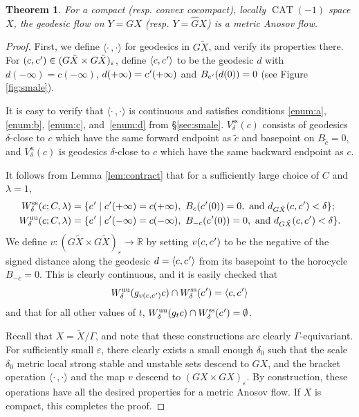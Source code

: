 \documentclass[JEP,XML,SOM,Unicode,NoFloatCountersInSection]{cedram}
\let\epsilon\varepsilon
\let\sep\mid
\newcommand{\lrangle}{\langle\cdot\,,\cdot\rangle}
\newcommand{\cpr}{c\mkern1mu'}
\newcommand{\sts}{\mathrm{ss}}
\newcommand{\uu}{\mathrm{uu}}
\newtheorem{thm}{Theorem}[section]
\theoremstyle{definition}
\numberwithin{equation}{section}
\DeclareMathOperator{\CAT}{CAT}
\begin{document}
\begin{thm} \label{t.smale}
For a compact (resp. convex cocompact), locally $\CAT(-1)$ space $X$, the geodesic flow on $Y= GX$ (resp. $Y=\hat GX$) is a metric Anosov flow.
\end{thm}

\begin{proof}
First, we define $\lrangle$ for geodesics in $G\tilde X$, and verify its properties there. For $(c,\cpr)\in (G\tilde X \times G\tilde X)_\epsilon$, define $\langle c,\cpr\rangle $ to be the geodesic $d$ with $d(-\infty) = c(-\infty)$, $d(+\infty) = \cpr(+\infty)$ and $B_{\cpr}(d(0)) = 0$ (see Figure \ref{fig:smale}).

It is easy to verify that $\lrangle$ is continuous and satisfies conditions \eqref{enum:a}, \eqref{enum:b}, \eqref{enum:c}, and~\eqref{enum:d} from \S \ref{sec:smale}. $V_\delta^{\sts}(c)$ consists of geodesics $\delta$-close to $c$ which have the same forward endpoint as $\tilde c$ and basepoint on $B_{\tilde c} = 0$, and $V_\delta^u(c)$ is geodesics $\delta$-close to $c$ which have the same backward endpoint as $c$.

It follows from Lemma \ref{lem:contract} that for a sufficiently large choice of $C$ and $\lambda = 1$,
\begin{align*}
W^{\sts}_\delta(c;C,\lambda) &= \{\cpr\sep \cpr(+\infty) = c(+\infty), \ B_{c}(\cpr(0))=0, \mbox{ and } d_{G\tilde X}(c,\cpr)<\delta \}; \\
W^{\uu}_\delta(c;C,\lambda) &= \{\cpr\sep \cpr(-\infty) = c(-\infty), \ B_{-c}(\cpr(0))=0, \mbox{ and } d_{G\tilde X}(c,\cpr)<\delta \}. 
\end{align*}
We define $v:(G\tilde X\times G\tilde X)_\epsilon \to \mathbb{R}$ by setting $v(c,\cpr)$ to be the negative of the signed distance along the geodesic $d = \langle c,\cpr\rangle $ from its basepoint to the horocycle $B_{-c}=0$. This is clearly continuous, and it is easily checked that
\[ W^{\uu}_\delta(g_{v(c,\cpr)}c) \cap W^{\sts}_\delta(\cpr) = \langle c,\cpr\rangle \]
and that for all other values of $t$, $W^{\uu}_\delta(g_tc) \cap W^{\sts}_\delta(\cpr) = \emptyset$.

Recall that $X = \tilde X /\Gamma$, and note that these constructions are clearly $\Gamma$-equivariant. For sufficiently small $\epsilon$, there clearly exists a small enough $\delta_0$ such that the scale $\delta_0$ metric local strong stable and unstable sets descend to $GX$, and the bracket operation $\lrangle$ and the map $v$ descend to $(GX \times GX)_\epsilon$. By construction, these operations have all the desired properties for a metric Anosov flow. If $X$ is compact, this completes the proof.


\end{proof}
\end{document}
